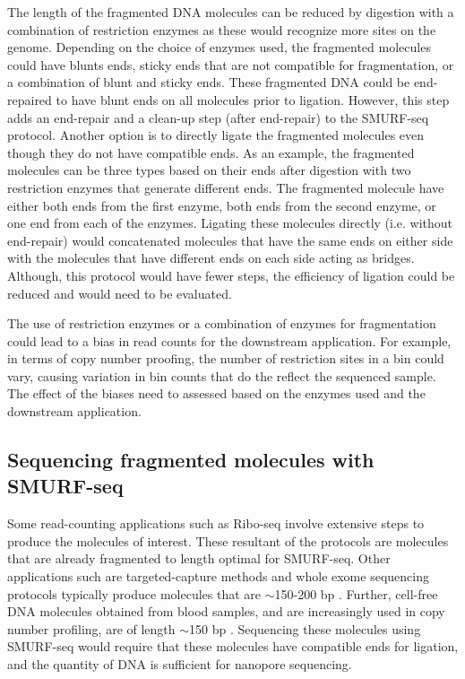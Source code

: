 The length of the fragmented DNA molecules can be reduced by digestion
with a combination of restriction enzymes as these would recognize more
sites on the genome. Depending on the choice of enzymes used, the
fragmented molecules could have blunts ends, sticky ends that are not
compatible for fragmentation, or a combination of blunt and sticky
ends.
%
These fragmented DNA could be end-repaired to have blunt ends on all
molecules prior to ligation. However, this step adds an end-repair and a
clean-up step (after end-repair) to the SMURF-seq protocol.
%
Another option is to directly ligate the fragmented molecules even though
they do not have compatible ends. As an example, the fragmented
molecules can be three types based on their ends after digestion with
two restriction enzymes that generate different ends. The fragmented
molecule have either both ends from the first enzyme, both ends from the
second enzyme, or one end from each of the enzymes. Ligating these
molecules directly (i.e. without end-repair) would concatenated molecules
that have the same ends on either side with the molecules that have
different ends on each side acting as bridges. Although, this protocol
would have fewer steps, the efficiency of ligation could be reduced and
would need to be evaluated.

The use of restriction enzymes or a combination of enzymes for
fragmentation could lead to a bias in read counts for the downstream
application. For example, in terms of copy number proofing, the number
of restriction sites in a bin could vary, causing variation in bin counts
that do the reflect the sequenced sample. The effect of the biases need
to assessed based on the enzymes used and the downstream application.



\subsection*{Sequencing fragmented molecules with SMURF-seq}
Some read-counting applications such as Ribo-seq \citep{} involve
extensive steps to produce the molecules of interest. These resultant of
the protocols are molecules that are already fragmented to length
optimal for SMURF-seq. Other applications such are targeted-capture
methods and whole exome sequencing protocols typically produce molecules
that are $\sim$150-200 bp \citep{}. Further, cell-free DNA molecules
obtained from blood samples, and are increasingly used in copy number
profiling, are of length $\sim$150 bp \citep{}.
%
Sequencing these molecules using SMURF-seq would require that these
molecules have compatible ends for ligation, and the quantity of DNA is
sufficient for nanopore sequencing.


